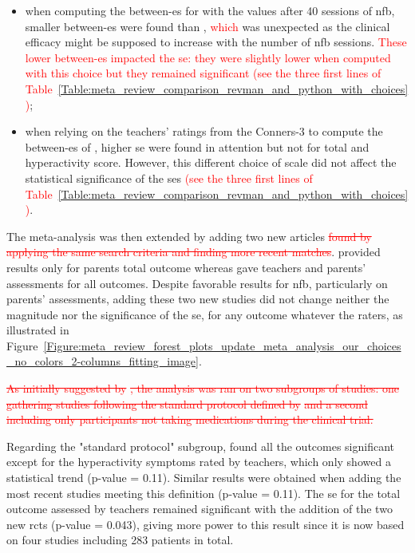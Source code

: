 \begin{itemize}
    \item when computing the between-\gls{es} for \citet{Arnold2014} with the values after 40 sessions of \gls{nfb}, 
      smaller between-\gls{es} were found than \citet{Cortese2016}, \textcolor{red}{which} was unexpected as  
			the clinical efficacy might be supposed to increase with the number of \gls{nfb} sessions. \textcolor{red}{These lower between-\gls{es}
			impacted the \gls{se}: they were slightly lower when computed with this choice but they remained significant (see the three first lines 
			of Table~\ref{Table:meta_review_comparison_revman_and_python_with_choices})};  
    \item when relying on the teachers' ratings from the Conners-3 to compute the between-\gls{es} of \citet{Steiner2014}, 
		higher \gls{se} were found in attention but not for total and hyperactivity score. However, this different choice of 
		scale did not affect the statistical significance of the \glspl{se} \textcolor{red}{(see the three first lines 
			of Table~\ref{Table:meta_review_comparison_revman_and_python_with_choices})}.
\end{itemize}

The meta-analysis was then extended by adding two new articles \citep{Strehl2017, Baumeister2016} \textcolor{red}{\sout{found 
by applying the same search criteria and finding more recent matches}}. \citet{Baumeister2016} provided results 
only for parents total outcome whereas \citet{Strehl2017} gave teachers and parents' assessments for all outcomes. 
Despite favorable results for \gls{nfb}, particularly on parents' assessments, adding these two new studies did not 
change neither the magnitude nor the significance of the \gls{se}, for any outcome whatever the raters,
as illustrated in Figure~\ref{Figure:meta_review_forest_plots_update_meta_analysis_our_choices_no_colors_2-columns_fitting_image}. 
 
\textcolor{red}{\sout{As initially suggested by }}\citeauthor{Cortese2016}\textcolor{red}{\sout{, the analysis was ran on two subgroups of studies: one gathering 
studies following the standard protocol defined by }} \citet{Arns2014} \textcolor{red}{\sout{and a second including only participants not taking medications 
during the clinical trial. }}

Regarding the "standard protocol" subgroup, \citet{Cortese2016} found all the outcomes significant except for the 
hyperactivity symptoms rated by teachers, which only showed a statistical trend (p-value = 0.11). Similar results 
were obtained when adding the most recent studies meeting this definition \citep{Strehl2017} (p-value = 0.11). 
The \gls{se} for the total outcome assessed by teachers remained significant with the addition of the two new
\glspl{rct} (p-value = 0.043), giving more power to this result since it is now based on four studies including 283
patients in total.

